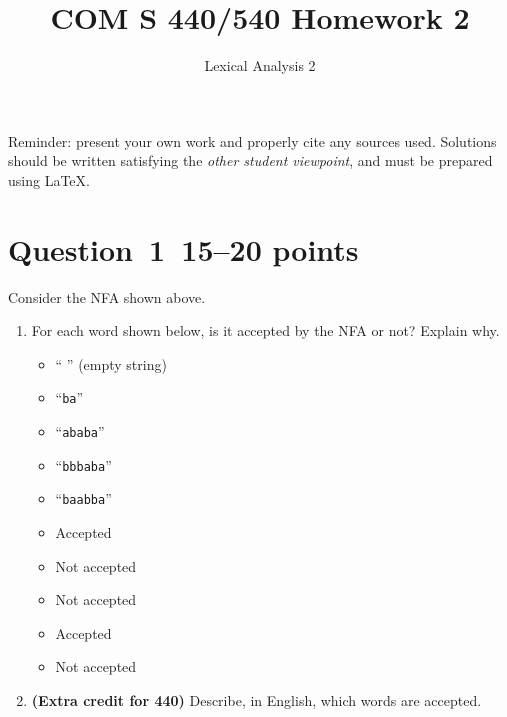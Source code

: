 \documentclass[10pt]{article}
\title{COM S 440/540 Homework 2}
\date{}
\author{Lexical Analysis 2}
\renewcommand{\thepage}{~}
\begin{document}
\maketitle

\noindent
Reminder: present your own work and properly cite any sources used.
Solutions should be written satisfying the \emph{other student viewpoint},
and must be prepared using \LaTeX.
\renewcommand{\thepage}{~}

\section*{Question~1~\hfill 15--20 points}

\begin{center}
\end{center}
Consider the NFA shown above.
\begin{enumerate}
\item
For each word shown below, is it accepted by the NFA or not?
Explain why.
\begin{itemize}
\item `` '' (empty string)
\item ``{\tt ba}''
\item ``{\tt ababa}''
\item ``{\tt bbbaba}''
\item ``{\tt baabba}''
\end{itemize}

\begin{framed}
\begin{itemize}
	\item Accepted
	\item Not accepted
	\item Not accepted
	\item Accepted
	\item Not accepted
\end{itemize}
\end{framed}

\item
{\bf (Extra credit for 440) }
Describe, in English, which words are accepted.
\end{enumerate}
\end{document}
